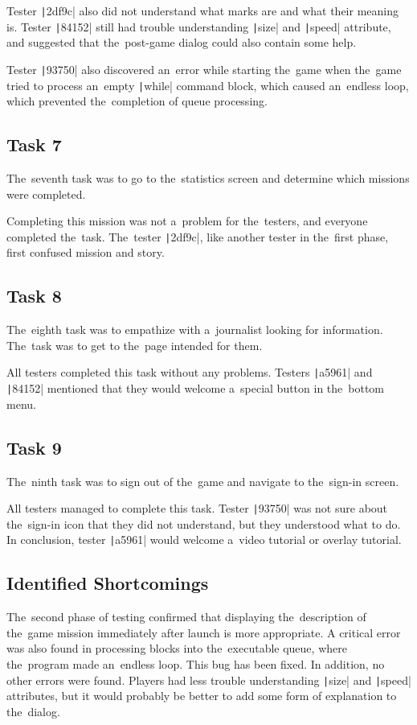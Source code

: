 Tester \texttt|2df9c| also did not understand what marks are and what their meaning is.
Tester \texttt|84152| still had trouble understanding \texttt|size| and \texttt|speed| attribute, and suggested that the~post-game dialog could also contain some help.

Tester \texttt|93750| also discovered an~error while starting the~game when the~game tried to process an~empty \texttt|while| command block, which caused an~endless loop, which prevented the~completion of queue processing.

\subsection*{Task 7}

The~seventh task was to go to the~statistics screen and determine which missions were completed.

Completing this mission was not a~problem for the~testers, and everyone completed the~task.
The~tester \texttt|2df9c|, like another tester in the~first phase, first confused mission and story.

\subsection*{Task 8}

The~eighth task was to empathize with a~journalist looking for information.
The~task was to get to the~page intended for them.

All testers completed this task without any problems.
Testers \texttt|a5961| and \texttt|84152| mentioned that they would welcome a~special button in the~bottom menu.

\subsection*{Task 9}

The~ninth task was to sign out of the~game and navigate to the~sign-in screen.

All testers managed to complete this task.
Tester \texttt|93750| was not sure about the~sign-in icon that they did not understand, but they understood what to do.
In conclusion, tester \texttt|a5961| would welcome a~video tutorial or overlay tutorial.

\subsection*{Identified Shortcomings}

The~second phase of testing confirmed that displaying the~description of the~game mission immediately after launch is more appropriate.
A critical error was also found in processing blocks into the~executable queue, where the~program made an~endless loop.
This bug has been fixed.
In addition, no other errors were found.
Players had less trouble understanding \texttt|size| and \texttt|speed| attributes, but it would probably be better to add some form of explanation to the~dialog.
